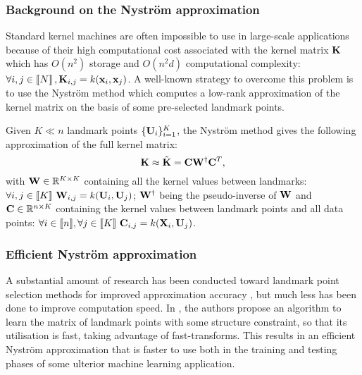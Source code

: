 \subsubsection{Background on the Nyström approximation}

Standard kernel machines are often impossible to use in large-scale applications because of their high computational cost associated with the kernel matrix ${\mathbf{K}}$ which has $O(n^2)$ storage and $O(n^2d)$ computational complexity: $\forall i,j \in\left \llbracket N\right \rrbracket, {\mathbf{K}}_{i,j} = k({\mathbf{x}}_i, {\mathbf{x}}_j)$. A well-known strategy to overcome this problem is to use the Nyström method which computes a low-rank approximation of the kernel matrix on the basis of some pre-selected landmark points. 

Given $K \ll n$ landmark points $\{{\mathbf{U}}_i\}_{i=1}^{K}$, the Nyström method gives the following approximation of the full kernel matrix:
%
\begin{equation}
 \label{eq:nystrom}
 {\mathbf{K}} \approx \tilde{{\mathbf{K}}} = {\mathbf{C}}{\mathbf{W}}^\dagger{\mathbf{C}}^T,
\end{equation}
%
with ${\mathbf{W}} \in \mathbb{R}^{K \times K}$ containing all the kernel values between landmarks: $\forall i,j \in [\![K]\!]~ {\mathbf{W}}_{i,j} = k({\mathbf{U}}_i, {\mathbf{U}}_j)$; ${\mathbf{W}}^\dagger$ being the pseudo-inverse of ${\mathbf{W}}$ and ${\mathbf{C}} \in \mathbb{R}^{n \times K}$ containing the kernel values between landmark points and all data points: $\forall i \in [\![n]\!], \forall j \in [\![K]\!]~ {\mathbf{C}}_{i, j} = k({\mathbf{X}}_i, {\mathbf{U}}_j)$.

\subsubsection{Efficient Nyström approximation}

A substantial amount of research has been conducted toward landmark point selection methods for improved approximation accuracy \cite{kumar2012sampling} \cite{musco2017recursive}, but much less has been done to improve computation speed. In \cite{si2016computationally}, the authors propose an algorithm to learn the matrix of landmark points with some structure constraint, so that its utilisation is fast, taking advantage of fast-transforms. This results in an efficient Nyström approximation that is faster to use both in the training and testing phases of some ulterior machine learning application.

